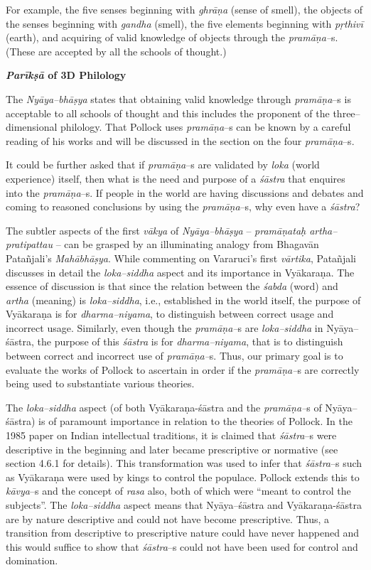For example, the five senses beginning with \textit{ghrāṇa }(sense of smell), the objects of the senses beginning with \textit{gandha }(smell), the five elements beginning with \textit{pṛthivī} (earth), and acquiring of valid knowledge of objects through the \textit{pramāṇa–}s. (These are accepted by all the schools of thought.)

\textbf{\textit{Parīkṣā} of 3D Philology}

The \textit{Nyāya–bhāṣya} states that obtaining valid knowledge through \textit{pramāṇa}–s is acceptable to all schools of thought and this includes the proponent of the three–dimensional philology. That Pollock uses \textit{pramāṇa}–s can be known by a careful reading of his works and will be discussed in the section on the four \textit{pramāṇa}–s.

It could be further asked that if \textit{pramāṇa}–s are validated by \textit{loka} (world experience) itself, then what is the need and purpose of a \textit{śāstra} that enquires into the \textit{pramāṇa}–s. If people in the world are having discussions and debates and coming to reasoned conclusions by using the \textit{pramāṇa}–s, why even have a \textit{śāstra}?

The subtler aspects of the first \textit{vākya} of \textit{Nyāya–bhāṣya }– \textit{pramāṇataḥ artha–pratipattau} – can be grasped by an illuminating analogy from Bhagavān Patañjali’s \textit{Mahābhāṣya}. While commenting on Vararuci's first \textit{vārtika}, Patañjali discusses in detail the \textit{loka–siddha} aspect and its importance in Vyākaraṇa. The essence of discussion is that since the relation between the \textit{śabda} (word) and \textit{artha} (meaning) is \textit{loka–siddha}, i.e., established in the world itself, the purpose of Vyākaraṇa is for \textit{dharma–niyama}, to distinguish between correct usage and incorrect usage. Similarly, even though the \textit{pramāṇa–}s are \textit{loka–siddha} in Nyāya–śāstra, the purpose of this \textit{śāstra} is for \textit{dharma–niyama}, that is to distinguish between correct and incorrect use of \textit{pramāṇa–}s. Thus, our primary goal is to evaluate the works of Pollock to ascertain in order if the \textit{pramāṇa–}s are correctly being used to substantiate various theories.

The \textit{loka–siddha }aspect (of both Vyākaraṇa-śāstra and the \textit{pramāṇa–}s of Nyāya–śāstra) is of paramount importance in relation to the theories of Pollock. In the 1985 paper on Indian intellectual traditions, it is claimed that \textit{śāstra}–s were descriptive in the beginning and later became prescriptive or normative (see section 4.6.1 for details). This transformation was used to infer that \textit{śāstra}–s such as Vyākaraṇa were used by kings to control the populace. Pollock extends this to \textit{kāvya}–s and the concept of \textit{rasa} also, both of which were “meant to control the subjects”. The \textit{loka–siddha }aspect means that Nyāya–śāstra and Vyākaraṇa-śāstra are by nature descriptive and could not have become prescriptive. Thus, a transition from descriptive to prescriptive nature could have never happened and this would suffice to show that \textit{śāstra}–s could not have been used for control and domination.


